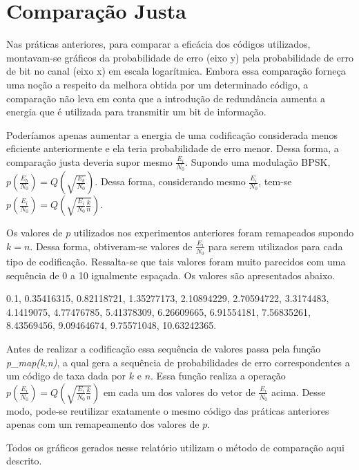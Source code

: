 \section{Comparação Justa}
Nas práticas anteriores, para comparar a eficácia dos códigos utilizados, montavam-se gráficos da probabilidade de erro (eixo y) pela probabilidade de erro de bit no canal (eixo x) em escala logarítmica. Embora essa comparação forneça uma noção  a respeito da melhora obtida por um determinado código, a comparação não leva em conta que a introdução de redundância aumenta a energia que é utilizada para transmitir um bit de informação.

Poderíamos apenas aumentar a energia de uma codificação considerada menos eficiente anteriormente e ela teria probabilidade de erro menor. Dessa forma, a comparação justa deveria supor mesmo $\frac{E_i}{N_0}$. Supondo uma modulação BPSK, $p\left(\frac{E_b}{N_0}\right) = Q\left(\sqrt{\frac{E_b}{N_0}}\right)$. Dessa forma, considerando mesmo $\frac{E_i}{N_0}$, tem-se $p\left(\frac{E_i}{N_0}\right) = Q\left(\sqrt{\frac{E_i}{N_0}\frac{k}{n}}\right)$.

Os valores de $p$ utilizados nos experimentos anteriores foram remapeados supondo $k = n$. Dessa forma, obtiveram-se valores de $\frac{E_i}{N_0}$ para serem utilizados para cada tipo de codificação. Ressalta-se que tais valores foram muito parecidos com uma sequência de 0 a 10 igualmente espaçada. Os valores são apresentados abaixo.

0.1, 0.35416315, 0.82118721, 1.35277173, 2.10894229, 2.70594722,
	3.3174483, 4.1419075, 4.77476785, 5.41378309, 6.26609665, 6.91554181,
	7.56835261, 8.43569456, 9.09464674, 9.75571048, 10.63242365.
	
Antes de realizar a codificação essa sequência de valores passa pela função \textit{p\_map(k,n)}, a qual gera a sequência de probabilidades de erro correspondentes a um código de taxa dada por $k$ e $n$. Essa função realiza a operação $p\left(\frac{E_i}{N_0}\right) = Q\left(\sqrt{\frac{E_i}{N_0}\frac{k}{n}}\right)$ em cada um dos valores do vetor de $\frac{E_i}{N_0}$ acima. Desse modo, pode-se reutilizar exatamente o mesmo código das práticas anteriores apenas com um remapeamento dos valores de $p$.

Todos os gráficos gerados nesse relatório utilizam o método de comparação aqui descrito.
